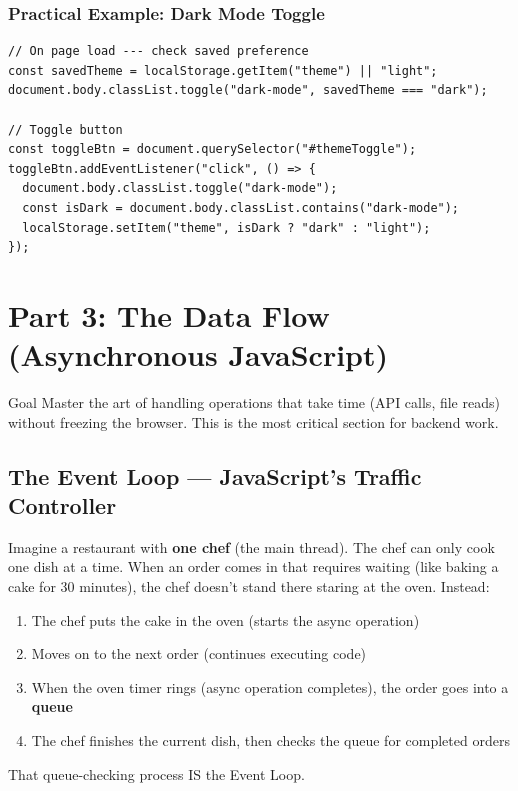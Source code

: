 \documentclass[12pt]{article}
\begin{document}
\subsubsection*{Practical Example: Dark Mode Toggle}

\begin{lstlisting}
// On page load --- check saved preference
const savedTheme = localStorage.getItem("theme") || "light";
document.body.classList.toggle("dark-mode", savedTheme === "dark");

// Toggle button
const toggleBtn = document.querySelector("#themeToggle");
toggleBtn.addEventListener("click", () => {
  document.body.classList.toggle("dark-mode");
  const isDark = document.body.classList.contains("dark-mode");
  localStorage.setItem("theme", isDark ? "dark" : "light");
});
\end{lstlisting}

\newpage

\section{Part 3: The Data Flow (Asynchronous JavaScript)}

\begin{conceptbox}{Goal}
Master the art of handling operations that take time (API calls, file reads) without freezing the browser. This is the most critical section for backend work.
\end{conceptbox}

\subsection{The Event Loop --- JavaScript's Traffic Controller}

\begin{analogybox}
Imagine a restaurant with \textbf{one chef} (the main thread). The chef can only cook one dish at a time. When an order comes in that requires waiting (like baking a cake for 30 minutes), the chef doesn't stand there staring at the oven. Instead:

\begin{enumerate}[noitemsep]
    \item The chef puts the cake in the oven (starts the async operation)
    \item Moves on to the next order (continues executing code)
    \item When the oven timer rings (async operation completes), the order goes into a \textbf{queue}
    \item The chef finishes the current dish, then checks the queue for completed orders
\end{enumerate}

That queue-checking process IS the Event Loop.
\end{analogybox}
\end{document}
